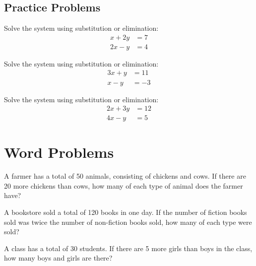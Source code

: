\documentclass{article}
\theoremstyle{mytheoremstyle}
\theoremstyle{mytheoremstyle}
\theoremstyle{myproblemstyle}
\theoremstyle{myproblemstyle}
\begin{document}
    \subsection{Practice Problems}
    \begin{problem}
        Solve the system using substitution or elimination:
        \begin{align*}
            x + 2y &= 7 \\
            2x - y &= 4
        \end{align*}
    \end{problem}

    \begin{problem}
        Solve the system using substitution or elimination:
        \begin{align*}
            3x + y &= 11 \\
            x - y &= -3
        \end{align*}
    \end{problem}

    \begin{problem}
        Solve the system using substitution or elimination:
        \begin{align*}
            2x + 3y &= 12 \\
            4x - y &= 5
        \end{align*}
    \end{problem}

    \pagebreak

    \section{Word Problems}
    \begin{problem}
        A farmer has a total of 50 animals, consisting of chickens and cows. If there are 20 more chickens than cows, how many of each type of animal does the farmer have?
    \end{problem}

    \begin{problem}
        A bookstore sold a total of 120 books in one day. If the number of fiction books sold was twice the number of non-fiction books sold, how many of each type were sold?
    \end{problem}

    \begin{problem}
        A class has a total of 30 students. If there are 5 more girls than boys in the class, how many boys and girls are there?
    \end{problem}
\end{document}
